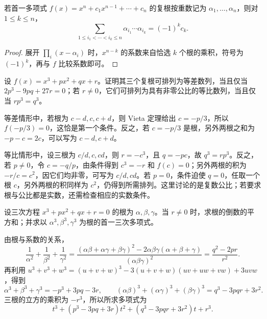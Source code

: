 \begin{theorem}[Vieta 定理]
\label{thm:poly-vieta}
若首一多项式 $f(x)=x^n+c_1x^{n-1}+\cdots+c_n$ 的复根按重数记为 $\alpha_1,\ldots,\alpha_n$，则对 $1\leq k\leq n$，
\begin{equation}
\label{eq:poly-vieta}
    \sum_{1\leq i_1<\cdots<i_k\leq n}\alpha_{i_1}\cdots\alpha_{i_k}
    =(-1)^kc_k.
\end{equation}
\end{theorem}
\begin{proof}
展开 $\prod_i(x-\alpha_i)$ 时，$x^{n-k}$ 的系数来自恰选 $k$ 个根的乘积，符号为 $(-1)^k$，再与 $f$ 比较系数即可。
\end{proof}

\begin{example}
\label{ex:poly-cubic-progressions}
设 $f(x)=x^3+px^2+qx+r$。证明其三个复根可排列为等差数列，当且仅当 $2p^3-9pq+27r=0$；若 $r\ne0$，它们可排列为具有非零公比的等比数列，当且仅当 $rp^3=q^3$。
\end{example}
\begin{solve}
等差情形中，若根为 $c-d,c,c+d$，则 Vieta 定理给出 $c=-p/3$，所以 $f(-p/3)=0$，这恰是第一个条件。反之，若 $c=-p/3$ 是根，另外两根之和为 $-p-c=2c$，可以写为 $c-d,c+d$。

等比情形中，设三根为 $c/d,c,cd$，则 $r=-c^3$，且 $q=-pc$，故 $q^3=rp^3$。反之，若 $p\ne0$，令 $c=-q/p$，由条件得到 $c^3=-r$ 和 $f(c)=0$；另外两根的积为 $-r/c=c^2$，因它们均非零，可写为 $c/d,cd$。若 $p=0$，条件迫使 $q=0$，任取一个根 $c$，另外两根的积同样为 $c^2$，仍得到所需排列。这里讨论的是复数公比；若要求根与公比都是实数，还需检查相应的实数条件。
\end{solve}

\begin{example}
\label{ex:poly-transform-roots}
设三次方程 $x^3+px^2+qx+r=0$ 的根为 $\alpha,\beta,\gamma$。当 $r\ne0$ 时，求根的倒数的平方和；并求以 $\alpha^3,\beta^3,\gamma^3$ 为根的首一三次多项式。
\end{example}
\begin{solve}
由根与系数的关系，
\[
    \frac1{\alpha^2}+\frac1{\beta^2}+\frac1{\gamma^2}
    =\frac{(\alpha\beta+\alpha\gamma+\beta\gamma)^2
    -2\alpha\beta\gamma(\alpha+\beta+\gamma)}{(\alpha\beta\gamma)^2}
    =\frac{q^2-2pr}{r^2}.
\]
再利用 $u^3+v^3+w^3=(u+v+w)^3-3(u+v+w)(uv+uw+vw)+3uvw$，得到
\[
    \alpha^3+\beta^3+\gamma^3=-p^3+3pq-3r,
    \qquad (\alpha\beta)^3+(\alpha\gamma)^3+(\beta\gamma)^3=q^3-3pqr+3r^2.
\]
三根的立方的乘积为 $-r^3$，所以所求多项式为
\[
    t^3+(p^3-3pq+3r)t^2+(q^3-3pqr+3r^2)t+r^3.
\]
\end{solve}

